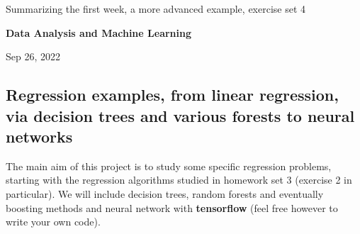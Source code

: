 \documentclass[%
oneside,                 %
final,                   %
10pt]{article}
\begin{document}

\newcommand{\exercisesection}[1]{\subsection*{#1}}






\thispagestyle{empty}

\begin{center}
{\LARGE\bf
\begin{spacing}{1.25}
Summarizing the first week, a more advanced example, exercise set 4
\end{spacing}
}
\end{center}


\begin{center}
{\bf Data Analysis and Machine Learning${}^{}$} \\ [0mm]
\end{center}

\begin{center}
\end{center}
    

\begin{center}
Sep 26, 2022
\end{center}

\vspace{1cm}


\subsection{Regression examples, from linear regression, via decision trees and various forests to neural networks}

The main aim of this project is to study some specific 
regression problems, starting with the regression algorithms studied
in homework set 3 (exercise 2 in particular).
We will include decision trees, random forests and eventually boosting
methods  and neural network with \textbf{tensorflow} (feel free however to write your own code). 
\end{document}
